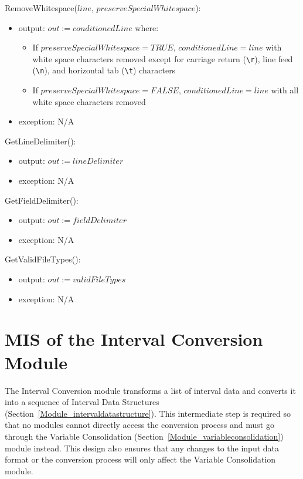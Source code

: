 \documentclass[12pt, titlepage]{article}
\begin{document}
\noindent RemoveWhitespace($line$, $preserveSpecialWhitespace$):
\begin{itemize}
	\item output: $out := conditionedLine$ where:
	\begin{itemize}
		\item If $preserveSpecialWhitespace = TRUE$, $conditionedLine = line$ 
		with white space characters removed except for carriage return 
		(\texttt{\textbackslash r}), line feed (\texttt{\textbackslash n}), and 
		horizontal tab (\texttt{\textbackslash t}) 
		characters
		\item If $preserveSpecialWhitespace = FALSE$, $conditionedLine = line$ 
		with all white space characters removed
	\end{itemize}
	\item exception: N/A
\end{itemize}

\noindent GetLineDelimiter():
\begin{itemize}
	\item output: $out := lineDelimiter$
	\item exception: N/A
\end{itemize}

\noindent GetFieldDelimiter():
\begin{itemize}
	\item output: $out := fieldDelimiter$
	\item exception: N/A
\end{itemize}

\noindent GetValidFileTypes():
\begin{itemize}
	\item output: $out := validFileTypes$
	\item exception: N/A
\end{itemize}

\newpage

\section{MIS of the Interval Conversion Module} 
\label{Module_intervalconversion}
The Interval Conversion module transforms a list of interval data and converts 
it into a sequence of Interval Data Structures 
(Section~\ref{Module_intervaldatastructure}). This intermediate step is 
required so that no modules cannot directly access the conversion process and 
must go through the Variable Consolidation 
(Section~\ref{Module_variableconsolidation}) module instead. This design also 
ensures that any changes to the input data format or the conversion process 
will only affect the Variable Consolidation module.
\end{document}
